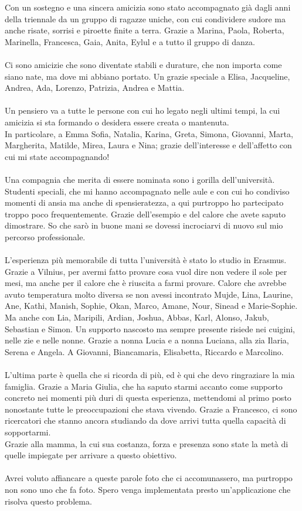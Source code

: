 Con un sostegno e una sincera amicizia
sono stato accompagnato già dagli anni della triennale
da un gruppo di ragazze uniche,
con cui condividere sudore ma anche risate,
sorrisi e piroette finite a terra.
Grazie a Marina, Paola, Roberta, Marinella,
Francesca, Gaia, Anita, Eylul e a tutto il gruppo di danza.\\
\\
Ci sono amicizie che sono diventate stabili e durature,
che non importa come siano nate, ma dove mi abbiano portato.
Un grazie speciale a Elisa, Jacqueline, Andrea, Ada, Lorenzo, Patrizia, Andrea e Mattia.\\
\\
Un pensiero va a tutte le persone con cui ho legato negli ultimi tempi,
la cui amicizia si sta formando o desidera essere creata o mantenuta.\\
In particolare, 
a Emma Sofia, Natalia, Karina, Greta, Simona, 
Giovanni, Marta, Margherita, Matilde, Mirea, Laura e Nina;
grazie dell'interesse e dell'affetto con cui mi state accompagnando!\\
\\ 
Una compagnia che merita di essere nominata sono i gorilla dell'università.
Studenti speciali, che mi hanno accompagnato nelle aule e
con cui ho condiviso momenti di ansia ma anche di spensieratezza,
a qui purtroppo ho partecipato troppo poco frequentemente.
Grazie dell'esempio e del calore che avete saputo dimostrare.
So che sarò in buone mani se dovessi incrociarvi di nuovo sul mio percorso professionale.\\
\\
L'esperienza più memorabile di tutta l'università è stato lo studio in Erasmus.
Grazie a Vilnius, per avermi fatto provare cosa vuol dire non vedere il sole per mesi,
ma anche per il calore che è riuscita a farmi provare.
Calore che avrebbe avuto temperatura molto diversa se non avessi incontrato
Mujde, Lina, Laurine, Ane, Kathi, Manish, Sophie, Okan, Marco, Amane, Nour, Sinead e Marie-Sophie.
Ma anche con Lia, Maripili, Ardian, Joshua, Abbas, Karl, Alonso, Jakub, Sebastian e Simon.
\clearpage
Un supporto nascosto ma sempre presente 
risiede nei cuigini, nelle zie e nelle nonne.
Grazie a nonna Lucia e a nonna Luciana,
alla zia Ilaria, Serena e Angela.
A Giovanni, Biancamaria, Elisabetta, Riccardo e Marcolino.\\
\\
L'ultima parte è quella che si ricorda di più,
ed è qui che devo ringraziare la mia famiglia.
Grazie a Maria Giulia, 
che ha saputo starmi accanto come supporto concreto 
nei momenti più duri di questa esperienza,
mettendomi al primo posto nonostante tutte le preoccupazioni che stava vivendo.
Grazie a Francesco,
ci sono ricercatori che stanno ancora studiando
da dove arrivi tutta quella capacità di sopportarmi.\\
Grazie alla mamma,
la cui sua costanza, forza e presenza
sono state la metà di quelle impiegate per arrivare a questo obiettivo.\\
\\
Avrei voluto affiancare a queste parole foto che ci accomunassero,
ma purtroppo non sono uno che fa foto.
Spero venga implementata presto un'applicazione che risolva questo problema.
   
